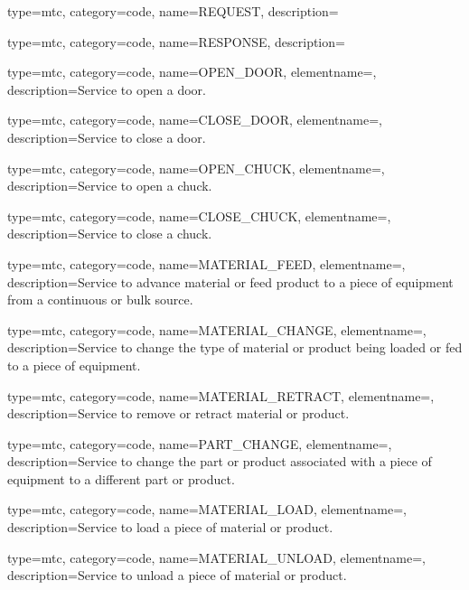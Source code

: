 {
  type=mtc,
  category=code,
  name={REQUEST},
  description={}
}

{
  type=mtc,
  category=code,
  name={RESPONSE},
  description={}
}

{
  type=mtc,
  category=code,
  name={OPEN\_DOOR},
  elementname=,
  description={Service to open a door. }
}


{
  type=mtc,
  category=code,
  name={CLOSE\_DOOR},
  elementname=,
  description={Service to close a door.}
}

{
  type=mtc,
  category=code,
  name={OPEN\_CHUCK},
  elementname=,
  description={Service to open a chuck. }
}


{
  type=mtc,
  category=code,
  name={CLOSE\_CHUCK},
  elementname=,
  description={Service to close a chuck.}
}

{
  type=mtc,
  category=code,
  name={MATERIAL\_FEED},
  elementname=,
  description={Service to advance material or feed product to a piece of equipment from a continuous or bulk source. }
}


{
  type=mtc,
  category=code,
  name={MATERIAL\_CHANGE},
  elementname=,
  description={Service to change the type of material or product being loaded or fed to a piece of equipment.}
}

{
  type=mtc,
  category=code,
  name={MATERIAL\_RETRACT},
  elementname=,
  description={Service to remove or retract material or product.}
}


{
  type=mtc,
  category=code,
  name={PART\_CHANGE},
  elementname=,
  description={Service to change the part or product associated with a piece of equipment to a different part or product.  }
}

{
  type=mtc,
  category=code,
  name={MATERIAL\_LOAD},
  elementname=,
  description={Service to load a piece of material or product.}
}

{
  type=mtc,
  category=code,
  name={MATERIAL\_UNLOAD},
  elementname=,
  description={Service to unload a piece of material or product.}
}



